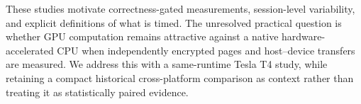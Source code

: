 These studies motivate correctness-gated measurements, session-level variability,
and explicit definitions of what is timed. The unresolved practical question is
whether GPU computation remains attractive against a native hardware-accelerated
CPU when independently encrypted pages and host--device transfers are measured.
We address this with a same-runtime Tesla T4 study, while retaining a compact
historical cross-platform comparison as context rather than treating it as
statistically paired evidence.
